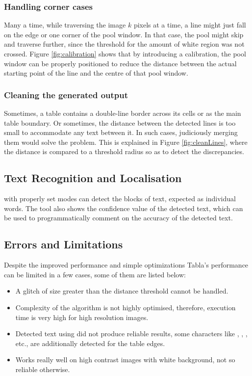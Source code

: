 \documentclass[10pt,journal,compsoc]{IEEEtran}
\begin{document}
\subsubsection{Handling corner cases}
Many a time, while traversing the image $k$ pixels at a time, a line might just fall on the edge or one corner of the pool window. In that case, the pool might skip and traverse further, since the threshold for the amount of white region was not crossed. Figure \ref{fig:calibration} shows that by introducing a calibration, the pool window can be properly positioned to reduce the distance between the actual starting point of the line and the centre of that pool window.

\subsubsection{Cleaning the generated output}
Sometimes, a table contains a double-line border across its cells or as the main table boundary. Or sometimes, the distance between the detected lines is too small to accommodate any text between it. In such cases, judiciously merging them would solve the problem. This is explained in Figure \ref{fig:cleanLines}, where the distance is compared to a threshold radius so as to detect the discrepancies.

\subsection{Text Recognition and Localisation}
 with properly set modes can detect the blocks of text, expected as individual words. The tool also shows the confidence value of the detected text, which can be used to programmatically comment on the accuracy of the detected text.

\subsection{Errors and Limitations}
Despite the improved performance and simple optimizations Tabla's performance can be limited in a few cases, some of them are listed below:
\begin{itemize}
    \item A glitch of size greater than the distance threshold cannot be handled.
    \item Complexity of the algorithm is not highly optimised, therefore, execution time is very high for high resolution images.
    \item Detected text using  did not produce reliable results, some characters like \inline{[}, \inline{]}, \inline{|}, etc., are additionally detected for the table edges.
    \item Works really well on high contrast images with white background, not so reliable otherwise.
\end{itemize}
\end{document}
